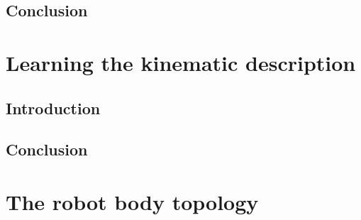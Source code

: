 \documentclass[12pt, a4paper]{article}
\begin{document}
\subsection*{Conclusion}


\section*{Learning the kinematic description}

\subsection*{Introduction}

\subsection*{Conclusion}


\section*{The robot body topology}
\end{document}
